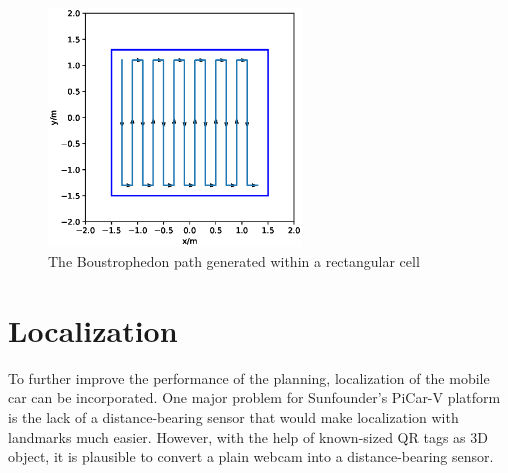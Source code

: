 \documentclass[12pt]{article}
\begin{document}
\begin{figure}[htbp]
\centering
\includegraphics[width=0.6\textwidth]{../figs/bp.eps}
\caption{The Boustrophedon path generated within a rectangular cell}\label{bp}
\end{figure}

\section{Localization}
To further improve the performance of the planning, localization of the mobile car can be incorporated.
One major problem for Sunfounder's PiCar-V platform is the lack of a distance-bearing sensor that would make localization with landmarks much easier. However, with the help of known-sized QR tags as 3D object, it is plausible to convert a plain webcam into a distance-bearing sensor.
\end{document}
